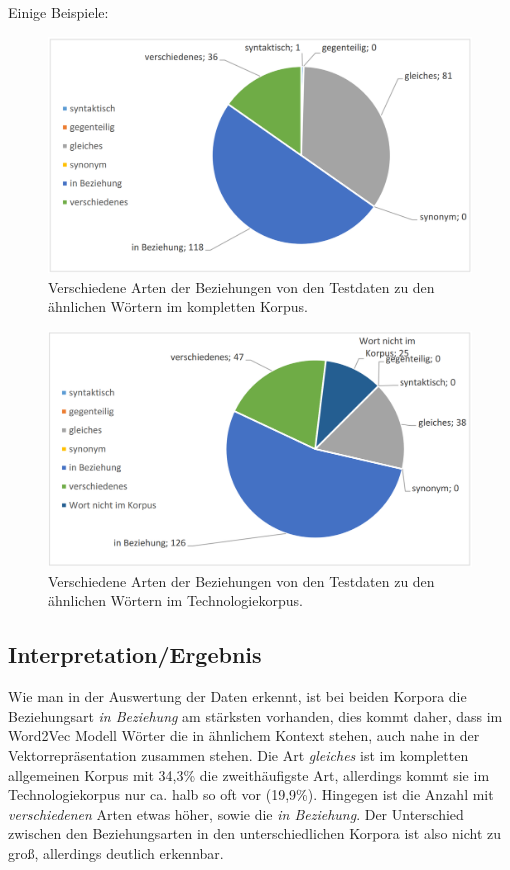 \documentclass[12pt,a4paper]{report}
\begin{document}
Einige Beispiele:\\


\begin{figure}[p]
  \begin{center}
	\includegraphics[scale=0.4]{BeziehungsartenFull.PNG}
  \end{center}  
  \caption{Verschiedene Arten der Beziehungen von den Testdaten zu den ähnlichen Wörtern im kompletten Korpus.}

\end{figure}
\begin{figure}[p]
  \begin{center}
	\includegraphics[scale=0.4]{BeziehungsartenTech.PNG}
  \end{center}  
  \caption{Verschiedene Arten der Beziehungen von den Testdaten zu den ähnlichen Wörtern im Technologiekorpus.}
  \end{figure}			
		
		
		\subsection{Interpretation/Ergebnis}
		Wie man in der Auswertung der Daten erkennt, ist bei beiden Korpora die Beziehungsart \textit{in Beziehung} am stärksten vorhanden, dies kommt daher, dass im Word2Vec Modell Wörter die in ähnlichem Kontext stehen, auch nahe in der Vektorrepräsentation zusammen stehen. Die Art \textit{gleiches} ist im kompletten allgemeinen Korpus mit 34,3\% die zweithäufigste Art, allerdings kommt sie im Technologiekorpus nur ca. halb so oft vor (19,9\%). Hingegen ist die Anzahl mit \textit{verschiedenen} Arten etwas höher, sowie die \textit{in Beziehung}. Der Unterschied zwischen den Beziehungsarten in den unterschiedlichen Korpora ist also nicht zu groß, allerdings deutlich erkennbar.\\
		
\end{document}
